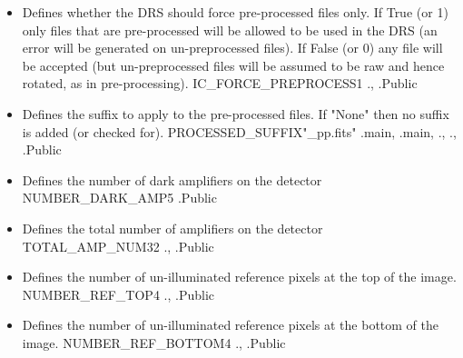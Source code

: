 \begin{itemize}

\item {} 
{Defines whether the DRS should force pre-processed files only. If True (or 1) only files that are pre-processed will be allowed to be used in the DRS (an error will be generated on un-preprocessed files). If False (or 0) any file will be accepted (but un-preprocessed files will be assumed to be raw and hence rotated, as in pre-processing).}
{IC\_FORCE\_PREPROCESS}{1}
{\AllRecipes}{\constantsfile}
{\spirouFile., \spirouFile.}{Public}

\item {} 
{Defines the suffix to apply to the pre-processed files. If "None" then no suffix is added (or checked for).}
{PROCESSED\_SUFFIX}{"\_pp.fits"}
{\AllRecipes}{\constantsfile}{\calpreprocess.main, \offlisting.main, \spirouFile., \spirouFile., \spirouImage.}{Public}

\item {} 
{Defines the number of dark amplifiers on the detector}
{NUMBER\_DARK\_AMP}{5}
{\calpreprocess}{\constantsfile}{\spirouImage.}{Public}

\item {} 
{Defines the total number of amplifiers on the detector}
{TOTAL\_AMP\_NUM}{32}
{\calpreprocess}{\constantsfile}{\spirouImage., \spirouImage.}{Public}

\item {} 
{Defines the number of un-illuminated reference pixels at the top of the image.}
{NUMBER\_REF\_TOP}{4}
{\calpreprocess}{\constantsfile}{\spirouImage., \spirouImage.}{Public}

\item {} 
{Defines the number of un-illuminated reference pixels at the bottom of the image.}
{NUMBER\_REF\_BOTTOM}{4}
{\calpreprocess}{\constantsfile}{\spirouImage., \spirouImage.}{Public}


\end{itemize}
